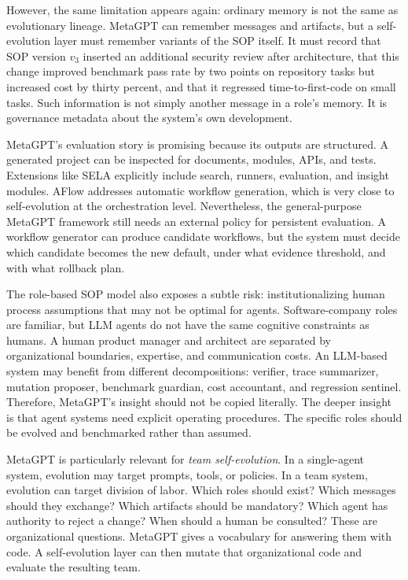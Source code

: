 However, the same limitation appears again: ordinary memory is not the same as evolutionary lineage.  MetaGPT can remember messages and artifacts, but a self-evolution layer must remember variants of the SOP itself.  It must record that SOP version $v_3$ inserted an additional security review after architecture, that this change improved benchmark pass rate by two points on repository tasks but increased cost by thirty percent, and that it regressed time-to-first-code on small tasks.  Such information is not simply another message in a role's memory.  It is governance metadata about the system's own development.

MetaGPT's evaluation story is promising because its outputs are structured.  A generated project can be inspected for documents, modules, APIs, and tests.  Extensions like SELA explicitly include search, runners, evaluation, and insight modules.  AFlow addresses automatic workflow generation, which is very close to self-evolution at the orchestration level.  Nevertheless, the general-purpose MetaGPT framework still needs an external policy for persistent evaluation.  A workflow generator can produce candidate workflows, but the system must decide which candidate becomes the new default, under what evidence threshold, and with what rollback plan.

The role-based SOP model also exposes a subtle risk: institutionalizing human process assumptions that may not be optimal for agents.  Software-company roles are familiar, but LLM agents do not have the same cognitive constraints as humans.  A human product manager and architect are separated by organizational boundaries, expertise, and communication costs.  An LLM-based system may benefit from different decompositions: verifier, trace summarizer, mutation proposer, benchmark guardian, cost accountant, and regression sentinel.  Therefore, MetaGPT's insight should not be copied literally.  The deeper insight is that agent systems need explicit operating procedures.  The specific roles should be evolved and benchmarked rather than assumed.

MetaGPT is particularly relevant for \emph{team self-evolution}.  In a single-agent system, evolution may target prompts, tools, or policies.  In a team system, evolution can target division of labor.  Which roles should exist?  Which messages should they exchange?  Which artifacts should be mandatory?  Which agent has authority to reject a change?  When should a human be consulted?  These are organizational questions.  MetaGPT gives a vocabulary for answering them with code.  A self-evolution layer can then mutate that organizational code and evaluate the resulting team.

